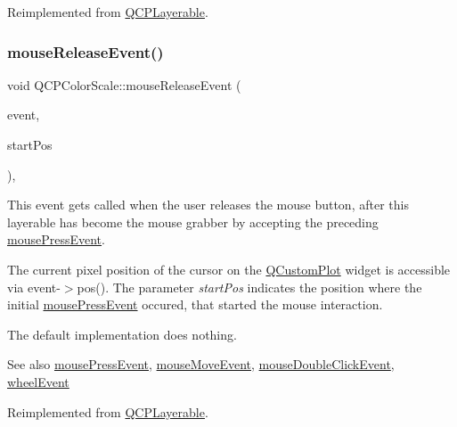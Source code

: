 Reimplemented from \mbox{\hyperlink{class_q_c_p_layerable_af6567604818db90f4fd52822f8bc8376}{Q\+C\+P\+Layerable}}.

\mbox{\label{class_q_c_p_color_scale_a6a35dd39ab4e5cb2d7b29ebb4d5b61b0}} 
\subsubsection{\texorpdfstring{mouse\+Release\+Event()}{mouseReleaseEvent()}}
{\footnotesize\ttfamily void Q\+C\+P\+Color\+Scale\+::mouse\+Release\+Event (\begin{DoxyParamCaption}\item[{Q\+Mouse\+Event $\ast$}]{event,  }\item[{const Q\+PointF \&}]{start\+Pos }\end{DoxyParamCaption})\hspace{0.3cm}{\ttfamily [protected]}, {\ttfamily [virtual]}}

This event gets called when the user releases the mouse button, after this layerable has become the mouse grabber by accepting the preceding \mbox{\hyperlink{class_q_c_p_color_scale_a91f633b97ffcd57fdf8cd814974c20e6}{mouse\+Press\+Event}}.

The current pixel position of the cursor on the \mbox{\hyperlink{class_q_custom_plot}{Q\+Custom\+Plot}} widget is accessible via {\ttfamily event-\/$>$pos()}. The parameter {\itshape start\+Pos} indicates the position where the initial \mbox{\hyperlink{class_q_c_p_color_scale_a91f633b97ffcd57fdf8cd814974c20e6}{mouse\+Press\+Event}} occured, that started the mouse interaction.

The default implementation does nothing.

\begin{DoxySeeAlso}{See also}
\mbox{\hyperlink{class_q_c_p_color_scale_a91f633b97ffcd57fdf8cd814974c20e6}{mouse\+Press\+Event}}, \mbox{\hyperlink{class_q_c_p_color_scale_a3b2bd79725aefaf2630fc76e90939442}{mouse\+Move\+Event}}, \mbox{\hyperlink{class_q_c_p_layerable_a4171e2e823aca242dd0279f00ed2de81}{mouse\+Double\+Click\+Event}}, \mbox{\hyperlink{class_q_c_p_color_scale_a63cf19be184f6670c9495ad3a9a1baeb}{wheel\+Event}} 
\end{DoxySeeAlso}


Reimplemented from \mbox{\hyperlink{class_q_c_p_layerable_aa0d79b005686f668622bbe66ac03ba2c}{Q\+C\+P\+Layerable}}.

